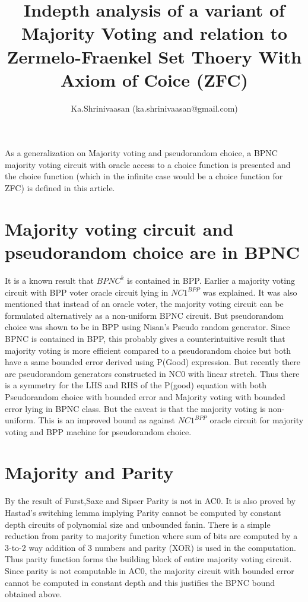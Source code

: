 \documentclass[11pt,onecolumn]{article}
\author{ Ka.Shrinivaasan (ka.shrinivaasan@gmail.com) }
\title{Indepth analysis of a variant of Majority Voting and relation to
Zermelo-Fraenkel Set Thoery With Axiom of Coice (ZFC)}
\begin{document}
\thispagestyle{empty}
\pagestyle{empty}
\maketitle
\begin{onecolabstract}
As a generalization on Majority voting and pseudorandom choice, a BPNC majority voting
circuit with oracle access to a choice function is presented and the choice function (which in the
infinite case would be a choice function for ZFC) is defined in this article.
\end{onecolabstract}
\section{Majority voting circuit and pseudorandom choice are in BPNC}
It is a known result that $BPNC^{k}$ is contained in BPP. Earlier a majority voting circuit with BPP
voter oracle circuit lying in $NC1^{BPP}$ was explained. It was also mentioned that instead of an
oracle voter, the majority voting circuit can be formulated alternatively as a non-uniform BPNC
circuit. But pseudorandom choice was shown to be in BPP using Nisan's Pseudo random
generator. Since BPNC is contained in BPP, this probably gives a counterintuitive result that
majority voting is more efficient compared to a pseudorandom choice but both have a same
bounded error derived using P(Good) expression. But recently there are pseudorandom
generators constructed in NC0 with linear stretch. Thus there is a symmetry for the LHS and
RHS of the P(good) equation with both Pseudorandom choice with bounded error and Majority
voting with bounded error lying in BPNC class. But the caveat is that the majority voting is non-
uniform. This is an improved bound as against $NC1^{BPP}$ oracle circuit for majority voting and
BPP machine for pseudorandom choice.

\section{Majority and Parity}
By the result of Furst,Saxe and Sipser Parity is not in AC0. It is also proved by Hastad's
switching lemma implying Parity cannot be computed by constant depth circuits of polynomial
size and unbounded fanin. There is a simple reduction from parity to majority function where
sum of bits are computed by a 3-to-2 way addition of 3 numbers and parity (XOR) is used in the
computation. Thus parity function forms the building block of entire majority voting circuit.
Since parity is not computable in AC0, the majority circuit with bounded error cannot be
computed in constant depth and this justifies the BPNC bound obtained above.
\end{document}
